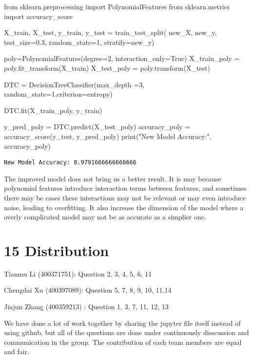 \documentclass[
  11pt,
  letterpaper,
  DIV=11,
  numbers=noendperiod]{scrartcl}
\newenvironment{Shaded}{\begin{snugshade}}{\end{snugshade}}
\newcommand{\BuiltInTok}[1]{\textcolor[rgb]{0.00,0.23,0.31}{#1}}
\newcommand{\DecValTok}[1]{\textcolor[rgb]{0.68,0.00,0.00}{#1}}
\newcommand{\FloatTok}[1]{\textcolor[rgb]{0.68,0.00,0.00}{#1}}
\newcommand{\ImportTok}[1]{\textcolor[rgb]{0.00,0.46,0.62}{#1}}
\newcommand{\NormalTok}[1]{\textcolor[rgb]{0.00,0.23,0.31}{#1}}
\newcommand{\OperatorTok}[1]{\textcolor[rgb]{0.37,0.37,0.37}{#1}}
\newcommand{\StringTok}[1]{\textcolor[rgb]{0.13,0.47,0.30}{#1}}
\newcommand{\VariableTok}[1]{\textcolor[rgb]{0.07,0.07,0.07}{#1}}
\begin{document}
\begin{Shaded}
\begin{Highlighting}[]
\ImportTok{from}\NormalTok{ sklearn.preprocessing }\ImportTok{import}\NormalTok{ PolynomialFeatures}
\ImportTok{from}\NormalTok{ sklearn.metrics }\ImportTok{import}\NormalTok{ accuracy\_score}


\NormalTok{X\_train, X\_test, y\_train, y\_test }\OperatorTok{=}\NormalTok{ train\_test\_split(}
\NormalTok{    new\_X, new\_y, test\_size}\OperatorTok{=}\FloatTok{0.3}\NormalTok{, random\_state}\OperatorTok{=}\DecValTok{1}\NormalTok{, stratify}\OperatorTok{=}\NormalTok{new\_y)}


\NormalTok{poly}\OperatorTok{=}\NormalTok{PolynomialFeatures(degree}\OperatorTok{=}\DecValTok{2}\NormalTok{, interaction\_only}\OperatorTok{=}\VariableTok{True}\NormalTok{)}
\NormalTok{X\_train\_poly }\OperatorTok{=}\NormalTok{ poly.fit\_transform(X\_train)}
\NormalTok{X\_test\_poly }\OperatorTok{=}\NormalTok{ poly.transform(X\_test)}


\NormalTok{DTC }\OperatorTok{=}\NormalTok{ DecisionTreeClassifier(max\_depth }\OperatorTok{=}\DecValTok{3}\NormalTok{, }
\NormalTok{    random\_state}\OperatorTok{=}\DecValTok{1}\NormalTok{,criterion}\OperatorTok{=}\StringTok{\textquotesingle{}entropy\textquotesingle{}}\NormalTok{) }


\NormalTok{DTC.fit(X\_train\_poly, y\_train)}


\NormalTok{y\_pred\_poly }\OperatorTok{=}\NormalTok{ DTC.predict(X\_test\_poly)}
\NormalTok{accuracy\_poly }\OperatorTok{=}\NormalTok{ accuracy\_score(y\_test, y\_pred\_poly)}
\BuiltInTok{print}\NormalTok{(}\StringTok{"New Model Accuracy:"}\NormalTok{, accuracy\_poly)}
\end{Highlighting}
\end{Shaded}

\begin{verbatim}
New Model Accuracy: 0.9791666666666666
\end{verbatim}

The improved model does not bring us a better result. It is may because
polynomial features introduce interaction terms between features, and
sometimes there may be cases these interactions may not be relevant or
may even introduce noise, leading to overfitting. It also increase the
dimension of the model where a overly complicated model may not be as
accurate as a simplier one.

\section{15 Distribution}\label{distribution}

Tianmu Li (400371751): Question 2, 3, 4, 5, 6, 11

Chengdai Xu (400397089): Question 5, 7, 8, 9, 10, 11,14

Jiajun Zhang (400359213) : Question 1, 3, 7, 11, 12, 13

We have done a lot of work together by sharing the jupyter file itself
instead of using github, but all of the questions are done under
continuously disscussion and communication in the group. The
contribution of each team members are equal and fair.
\end{document}
